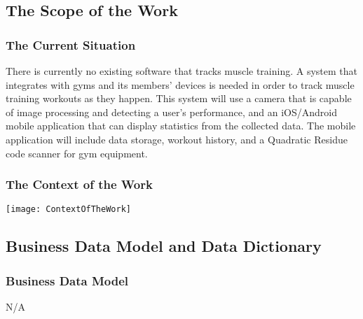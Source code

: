\documentclass{article}
\begin{document}
\subsection{The Scope of the Work}
\subsubsection{The Current Situation}
There is currently no existing software that tracks muscle training. A system that integrates with gyms and its members' devices is needed in order to track muscle training workouts as they happen. This system will use a camera that is capable of image processing and detecting a user's performance, and an iOS/Android mobile application that can display statistics from the collected data. The mobile application will include data storage, workout history, and a Quadratic Residue code scanner for gym equipment.

\subsubsection{The Context of the Work}
\begingroup
\texttt{[image: ContextOfTheWork]}
\endgroup



\subsection{Business Data Model and Data Dictionary}
\subsubsection{Business Data Model}
N/A
\end{document}
